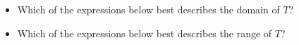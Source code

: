 \documentclass{ximera}
\begin{document}
\begin{question}
\begin{itemize}
\item Which of the expressions below best describes the domain of $T$?
\begin{multipleChoice}
\choice  {$[-7,8]$}
\choice  {$[-6,6]$}
\choice  {$[-7,-1] \cup [3,8]$}
\choice [correct] {$[-7,-1] \cup (3,8]$}
\end{multipleChoice}




\item Which of the expressions below best describes the range of $T$?
\begin{multipleChoice}
\choice [correct] {$[-6,6]$}
\choice  {$(-4, 1]$}
\choice  {$[-6,6] \cup (-4,1]$}
\choice  {$[-6,6] \cup [-4,1]$}
\end{multipleChoice}
\end{itemize}


\end{question}
\end{document}
